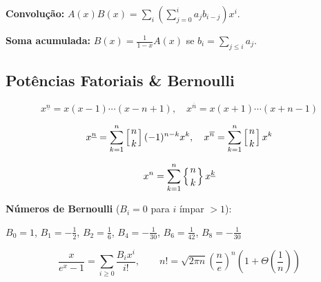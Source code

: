 \textbf{Convolução:} $A(x)B(x)=\sum_i\left(\sum_{j=0}^i a_jb_{i-j}\right)x^i$.

\textbf{Soma acumulada:} $B(x)=\frac{1}{1-x}A(x)$ se $b_i=\sum_{j\leq i}a_j$.

\subsection{Potências Fatoriais \& Bernoulli}

\[x^{\underline{n}}=x(x-1)\cdots(x-n+1), \quad x^{\overline{n}}=x(x+1)\cdots(x+n-1)\]

\[x^{\underline{n}}=\sum_{k=1}^n\left[{n\atop k}\right](-1)^{n-k}x^k, \quad x^{\overline{n}}=\sum_{k=1}^n\left[{n\atop k}\right]x^k\]

\[x^n=\sum_{k=1}^n\left\{{n\atop k}\right\}x^{\underline{k}}\]

\textbf{Números de Bernoulli} ($B_i=0$ para $i$ ímpar $>1$):

$B_0{=}1$, $B_1{=}-\tfrac12$, $B_2{=}\tfrac16$, $B_4{=}-\tfrac{1}{30}$, $B_6{=}\tfrac{1}{42}$, $B_8{=}-\tfrac{1}{30}$

\[\frac{x}{e^x-1}=\sum_{i\geq0}\frac{B_ix^i}{i!}, \qquad n!=\sqrt{2\pi n}\left(\frac{n}{e}\right)^n\!\left(1+\Theta\!\left(\frac1n\right)\right)\]

